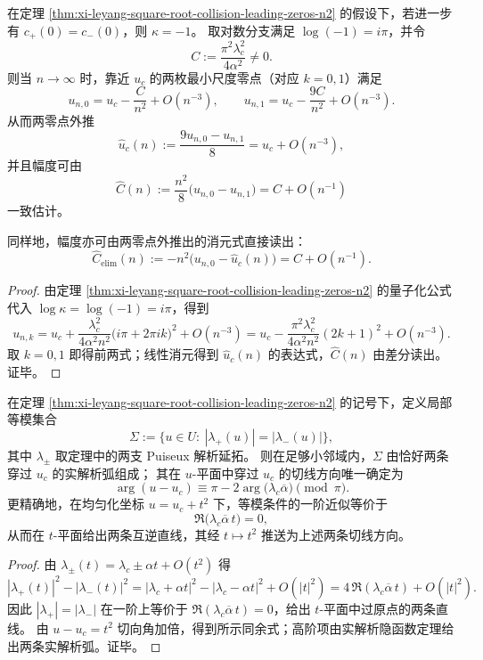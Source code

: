 \begin{corollary}[对称可见性下的两零点外推与幅度消去]\label{cor:xi-leyang-two-leading-zeros-extrapolate-uc}
在定理 \ref{thm:xi-leyang-square-root-collision-leading-zeros-n2} 的假设下，若进一步有 \(c_+(0)=c_-(0)\)，则 \(\kappa=-1\)。
取对数分支满足 \(\log(-1)=i\pi\)，并令
\[
C:=\frac{\pi^2\lambda_c^2}{4\alpha^2}\neq 0.
\]
则当 \(n\to\infty\) 时，靠近 \(u_c\) 的两枚最小尺度零点（对应 \(k=0,1\)）满足
\[
u_{n,0}=u_c-\frac{C}{n^2}+O(n^{-3}),
\qquad
u_{n,1}=u_c-\frac{9C}{n^2}+O(n^{-3}).
\]
从而两零点外推
\[
\widehat u_c(n):=\frac{9u_{n,0}-u_{n,1}}{8}
=u_c+O(n^{-3}),
\]
并且幅度可由
\[
\widehat C(n):=\frac{n^2}{8}\bigl(u_{n,0}-u_{n,1}\bigr)=C+O(n^{-1})
\]
一致估计。
\par
同样地，幅度亦可由两零点外推出的消元式直接读出：
\[
\widehat C_{\mathrm{elim}}(n):=-n^2\bigl(u_{n,0}-\widehat u_c(n)\bigr)=C+O(n^{-1}).
\]
\end{corollary}
\begin{proof}
由定理 \ref{thm:xi-leyang-square-root-collision-leading-zeros-n2} 的量子化公式代入 \(\log\kappa=\log(-1)=i\pi\)，得到
\[
u_{n,k}
=u_c+\frac{\lambda_c^2}{4\alpha^2n^2}\bigl(i\pi+2\pi i k\bigr)^2+O(n^{-3})
=u_c-\frac{\pi^2\lambda_c^2}{4\alpha^2n^2}(2k+1)^2+O(n^{-3}).
\]
取 \(k=0,1\) 即得前两式；线性消元得到 \(\widehat u_c(n)\) 的表达式，\(\widehat C(n)\) 由差分读出。证毕。
\end{proof}

\begin{proposition}[平方根分歧点的等模曲线切线方向]\label{prop:xi-leyang-equimodular-tangent-square-root}
在定理 \ref{thm:xi-leyang-square-root-collision-leading-zeros-n2} 的记号下，定义局部等模集合
\[
\Sigma:=\{u\in U:\ |\lambda_+(u)|=|\lambda_-(u)|\},
\]
其中 \(\lambda_\pm\) 取定理中的两支 Puiseux 解析延拓。
则在足够小邻域内，\(\Sigma\) 由恰好两条穿过 \(u_c\) 的实解析弧组成；
其在 \(u\)-平面中穿过 \(u_c\) 的切线方向唯一确定为
\[
\arg(u-u_c)\equiv \pi-2\arg\bigl(\lambda_c\overline{\alpha}\bigr)\pmod{\pi}.
\]
更精确地，在均匀化坐标 \(u=u_c+t^2\) 下，等模条件的一阶近似等价于
\[
\Re\bigl(\lambda_c\overline{\alpha}\,t\bigr)=0,
\]
从而在 \(t\)-平面给出两条互逆直线，其经 \(t\mapsto t^2\) 推送为上述两条切线方向。
\end{proposition}
\begin{proof}
由 \(\lambda_\pm(t)=\lambda_c\pm\alpha t+O(t^2)\) 得
\[
|\lambda_+(t)|^2-|\lambda_-(t)|^2
=|\lambda_c+\alpha t|^2-|\lambda_c-\alpha t|^2+O(|t|^2)
=4\,\Re(\lambda_c\overline{\alpha}\,t)+O(|t|^2).
\]
因此 \(|\lambda_+|=|\lambda_-|\) 在一阶上等价于 \(\Re(\lambda_c\overline{\alpha}\,t)=0\)，给出 \(t\)-平面中过原点的两条直线。
由 \(u-u_c=t^2\) 切向角加倍，得到所示同余式；高阶项由实解析隐函数定理给出两条实解析弧。证毕。
\end{proof}

